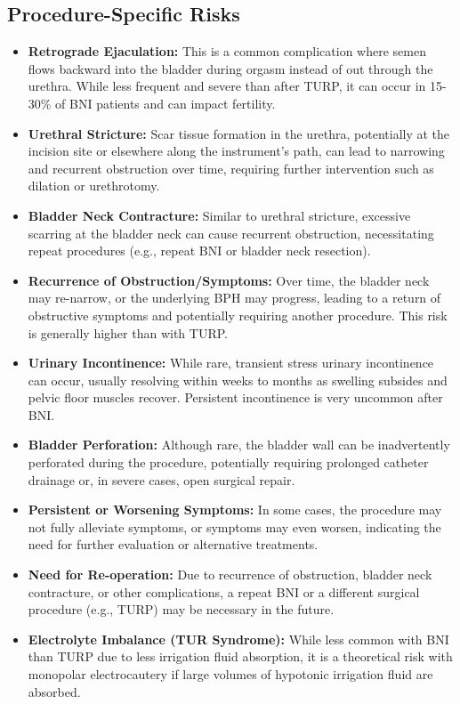 \subsection*{Procedure-Specific Risks}
\begin{itemize}
  \item \textbf{Retrograde Ejaculation:} This is a common complication where semen flows backward into the bladder during orgasm instead of out through the urethra. While less frequent and severe than after TURP, it can occur in 15-30\% of BNI patients and can impact fertility.
  \item \textbf{Urethral Stricture:} Scar tissue formation in the urethra, potentially at the incision site or elsewhere along the instrument's path, can lead to narrowing and recurrent obstruction over time, requiring further intervention such as dilation or urethrotomy.
  \item \textbf{Bladder Neck Contracture:} Similar to urethral stricture, excessive scarring at the bladder neck can cause recurrent obstruction, necessitating repeat procedures (e.g., repeat BNI or bladder neck resection).
  \item \textbf{Recurrence of Obstruction/Symptoms:} Over time, the bladder neck may re-narrow, or the underlying BPH may progress, leading to a return of obstructive symptoms and potentially requiring another procedure. This risk is generally higher than with TURP.
  \item \textbf{Urinary Incontinence:} While rare, transient stress urinary incontinence can occur, usually resolving within weeks to months as swelling subsides and pelvic floor muscles recover. Persistent incontinence is very uncommon after BNI.
  \item \textbf{Bladder Perforation:} Although rare, the bladder wall can be inadvertently perforated during the procedure, potentially requiring prolonged catheter drainage or, in severe cases, open surgical repair.
  \item \textbf{Persistent or Worsening Symptoms:} In some cases, the procedure may not fully alleviate symptoms, or symptoms may even worsen, indicating the need for further evaluation or alternative treatments.
  \item \textbf{Need for Re-operation:} Due to recurrence of obstruction, bladder neck contracture, or other complications, a repeat BNI or a different surgical procedure (e.g., TURP) may be necessary in the future.
  \item \textbf{Electrolyte Imbalance (TUR Syndrome):} While less common with BNI than TURP due to less irrigation fluid absorption, it is a theoretical risk with monopolar electrocautery if large volumes of hypotonic irrigation fluid are absorbed.
\end{itemize}

